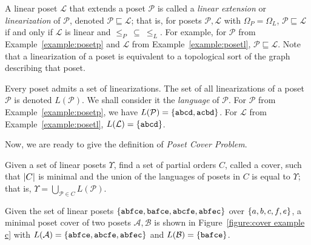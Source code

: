 \documentclass[12pt]{llncs}
\DeclarePairedDelimiter{\set}{\{}{\}}
\DeclarePairedDelimiter{\abs}{\lvert}{\rvert}
\let\oldleq\leq
\renewcommand{\leq}[1][]{\oldleq_{#1}}
\newcommand{\poset}[1]{\mathcal{#1}}
\newcommand{\uni}[1][]{\Omega_{#1}}
\newcommand{\lang}[1]{L(#1)}
\newcommand{\lin}[1]{\texttt{#1}}
\newcommand{\lext}{\sqsubseteq}
\begin{document}
A linear poset $\poset{L}$ that extends a poset $\poset{P}$ is called a \emph{linear extension} or \emph{linearization} of $\poset{P}$, denoted $\poset{P} \lext \poset{L}$; that is, for posets $\poset{P},\poset{L}$ with $\uni[P] \!=\! \uni[L]$, $\poset{P} \lext \poset{L}$ if and only if $\poset{L}$ is linear and $\leq[P] \>\subseteq\> \leq[L]$. For example, for $\poset{P}$ from Example~\ref{example:posetp} and $\poset{L}$ from Example~\ref{example:posetl}, $\poset{P} \lext \poset{L}$. Note that a linearization of a poset is equivalent to a topological sort of the graph describing that poset.

Every poset admits a set of linearizations. The set of all linearizations of a poset $\poset{P}$ is denoted $\lang{\poset{P}}$. We shall consider it the \emph{language} of $\poset{P}$. For $\poset{P}$ from Example~\ref{example:posetp}, we have $\lang{\poset{P}} = \set{\lin{abcd},\lin{acbd}}$. For $\poset{L}$ from Example~\ref{example:posetl}, $\lang{\poset{L}} = \set{\lin{abcd}}$.

Now, we are ready to give the definition of \emph{Poset Cover Problem}.

\begin{definition}
    Given a set of linear posets $\Upsilon$, find a set of partial orders $C$, called a cover, such that $\abs{C}$ is minimal and the union of the languages of posets in $C$ is equal to $\Upsilon$; that is, $\Upsilon = \bigcup_{\poset{P} \in C} \lang{\poset{P}}$.
    \label{definition:pcp}
\end{definition}

\begin{example}
    Given the set of linear posets $\set{\lin{abfce},\lin{bafce},\lin{abcfe},\lin{abfec}}$ over $\set{a,b,c,f,e}$, a minimal poset cover of two posets $\poset{A},\poset{B}$ is shown in Figure~\ref{figure:cover example c} with ${\lang{\poset{A}} = \set{\lin{abfce},\lin{abcfe},\lin{abfec}}}$ and ${\lang{\poset{B}} = \set{\lin{bafce}}}$.
    \label{example:cover example}
\end{example}
\end{document}
